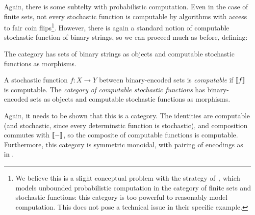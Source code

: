 Again, there is some subtelty with probabilistic computation. Even in the case
of finite sets, not every stochastic function is computable by algorithms with
access to fair coin flips\footnote{
  We believe this is a slight conceptual problem with the strategy
  of~\cite[Section 6]{broadbent-karvonen-2022}, which models unbounded
  probabilistic computation in the category of finite sets and stochastic
  functions: this category is too powerful to reasonably model computation. This
  does not pose a technical issue in their specific example.
}. However, there is again a standard notion of computable stochastic function
of binary strings, so we can proceed much as before, defining:
\begin{dfn}
  The category  has sets of binary strings as objects and
  computable stochastic functions as morphisms.

  A stochastic function $f:X\to Y $ between binary-encoded sets is
  \emph{computable} if $\llbracket f \rrbracket$ is computable. The \emph{category of
  computable stochastic functions}  has binary-encoded sets as
  objects and computable stochastic functions as morphisms.
\end{dfn}

Again, it needs to be shown that this is a category. The identities are
computable (and stochastic, since every determinstic function is stochastic),
and composition commutes with $\llbracket - \rrbracket$, so the composite of computable
functions is computable. Furthermore, this category is symmetric monoidal, with
pairing of encodings as in .

